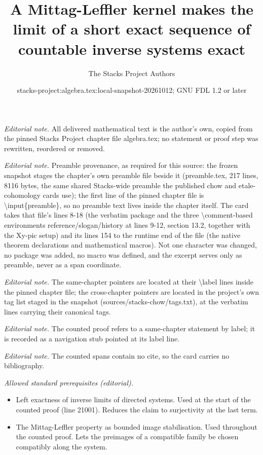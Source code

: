 \documentclass[10pt,a4paper]{amsart}
\title{A Mittag-Leffler kernel makes the limit of a short exact sequence of countable inverse systems exact}
\author{The Stacks Project Authors}
\date{stacks-project:algebra.tex:local-snapshot-20261012; GNU FDL 1.2 or later}
\theoremstyle{plain}
\theoremstyle{definition}
\theoremstyle{remark}
\numberwithin{equation}{subsection}
\begin{document}
\maketitle
\noindent\textit{Editorial note.} All delivered mathematical text is the author's own, copied from the pinned Stacks Project chapter file algebra.tex; no statement or proof step was rewritten, reordered or removed.\par\medskip
\noindent\textit{Editorial note.} Preamble provenance, as required for this source: the frozen snapshot stages the chapter's own preamble file beside it (preamble.tex, 217 lines, 8116 bytes, the same shared Stacks-wide preamble the published chow and etale-cohomology cards use); the first line of the pinned chapter file is \textbackslash{}input\{preamble\}, so no preamble text lives inside the chapter itself. The card takes that file's lines 8-18 (the verbatim package and the three \textbackslash{}comment-based environments reference/slogan/history at lines 9-12, section 13.2, together with the Xy-pic setup) and its lines 154 to the runtime end of the file (the native theorem declarations and mathematical macros). Not one character was changed, no package was added, no macro was defined, and the excerpt serves only as preamble, never as a span coordinate.\par\medskip
\noindent\textit{Editorial note.} The same-chapter pointers are located at their \textbackslash{}label lines inside the pinned chapter file; the cross-chapter pointers are located in the project's own tag list staged in the snapshot (sources/stacks-chow/tags.txt), at the verbatim lines carrying their canonical tags.\par\medskip
\noindent\textit{Editorial note.} The counted proof refers to a same-chapter statement by label; it is recorded as a navigation stub pointed at its label line.\par\medskip
\noindent\textit{Editorial note.} The counted spans contain no cite, so the card carries no bibliography.\par\medskip
\noindent\textit{Allowed standard prerequisites (editorial).}\begin{itemize}
\item Left exactness of inverse limits of directed systems. Used at the start of the counted proof (line 21001). Reduces the claim to surjectivity at the last term.
\item The Mittag-Leffler property as bounded image stabilisation. Used throughout the counted proof. Lets the preimages of a compatible family be chosen compatibly along the system.
\end{itemize}\medskip
\end{document}
